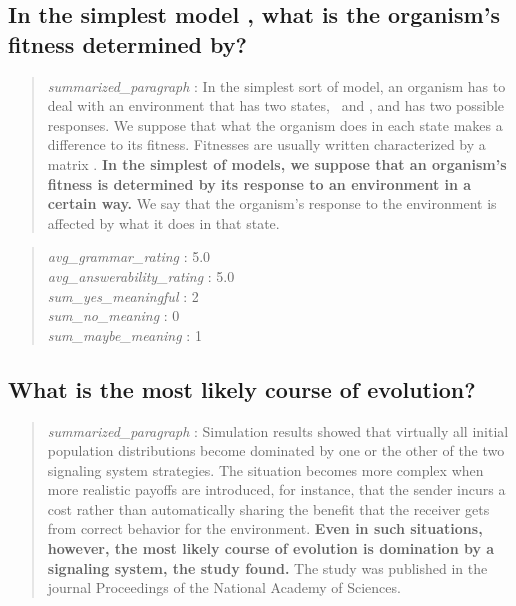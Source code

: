 \hypertarget{in-the-simplest-model-what-is-the-organisms-fitness-determined-by}{%
\subsection{In the simplest model , what is the organism's fitness
determined
by?}\label{in-the-simplest-model-what-is-the-organisms-fitness-determined-by}}

\begin{quote}
\emph{summarized\_paragraph} : In the simplest sort of model, an
organism has to deal with an environment that has two states, ~and , and
has two possible responses. We suppose that what the organism does in
each state makes a difference to its fitness. Fitnesses are usually
written characterized by a matrix . \textbf{In the simplest of models,
we suppose that an organism's fitness is determined by its response to
an environment in a certain way.} We say that the organism's response to
the environment is affected by what it does in that state.
\end{quote}

\begin{quote}
\emph{avg\_grammar\_rating} : 5.0\\
\emph{avg\_answerability\_rating} : 5.0\\
\emph{sum\_yes\_meaningful} : 2\\
\emph{sum\_no\_meaning} : 0\\
\emph{sum\_maybe\_meaning} : 1
\end{quote}

\hypertarget{what-is-the-most-likely-course-of-evolution}{%
\subsection{What is the most likely course of
evolution?}\label{what-is-the-most-likely-course-of-evolution}}

\begin{quote}
\emph{summarized\_paragraph} : Simulation results showed that virtually
all initial population distributions become dominated by one or the
other of the two signaling system strategies. The situation becomes more
complex when more realistic payoffs are introduced, for instance, that
the sender incurs a cost rather than automatically sharing the benefit
that the receiver gets from correct behavior for the environment.
\textbf{Even in such situations, however, the most likely course of
evolution is domination by a signaling system, the study found.} The
study was published in the journal Proceedings of the National Academy
of Sciences.
\end{quote}

